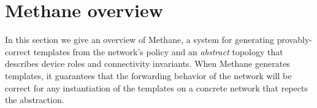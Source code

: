 \documentclass[numbers, 10pt, preprint]{sigplanconf}
\newcommand{\sysname}{{\small \sf Methane}\xspace}
\newcommand{\sysnamesec}{{\sf Methane}\xspace}
\begin{document}
%

%
%
%
%

\section{Methane overview}
\label{sec:overview}

In this section we give an overview of \sysname, a system for generating provably-correct templates from the network's policy and an {\em abstract} topology that describes device roles and connectivity invariants.
%
%
When \sysname generates templates, it guarantees that the forwarding behavior of the network will be correct for any instantiation of the templates on a concrete network that repects the abstraction.
\end{document}
